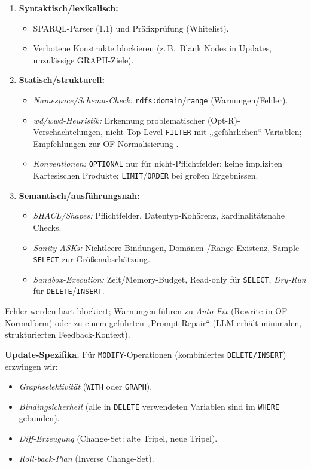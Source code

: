 \begin{enumerate}
  \item \textbf{Syntaktisch/lexikalisch:}
  \begin{itemize}
    \item SPARQL-Parser (1.1) und Präfixprüfung (Whitelist).
    \item Verbotene Konstrukte blockieren (z.\,B.\ Blank Nodes in Updates, unzulässige GRAPH-Ziele).
  \end{itemize}
  \item \textbf{Statisch/strukturell:}
  \begin{itemize}
    \item \emph{Namespace/Schema-Check:} \texttt{rdfs:domain}/\texttt{range} (Warnungen/Fehler).
    \item \emph{wd/wwd-Heuristik:} Erkennung problematischer (Opt-R)-Verschachtelungen, nicht-Top-Level \texttt{FILTER} mit „gefährlichen“ Variablen; Empfehlungen zur OF-Normalisierung \cite{kaminski2016beyond}.
    \item \emph{Konventionen:} \texttt{OPTIONAL} nur für nicht-Pflichtfelder; keine impliziten Kartesischen Produkte; \texttt{LIMIT}/\texttt{ORDER} bei großen Ergebnissen.
  \end{itemize}
  \item \textbf{Semantisch/ausführungsnah:}
  \begin{itemize}
    \item \emph{SHACL/Shapes:} Pflichtfelder, Datentyp-Kohärenz, kardinalitätsnahe Checks.
    \item \emph{Sanity-ASKs:} Nichtleere Bindungen, Domänen-/Range-Existenz, Sample-\texttt{SELECT} zur Größenabschätzung.
    \item \emph{Sandbox-Execution:} Zeit/Memory-Budget, Read-only für \texttt{SELECT}, \emph{Dry-Run} für \texttt{DELETE}/\texttt{INSERT}.
  \end{itemize}
\end{enumerate}

Fehler werden hart blockiert; Warnungen führen zu \emph{Auto-Fix} (Rewrite in OF-Normalform) oder zu einem geführten „Prompt-Repair“ (LLM erhält minimalen, strukturierten Feedback-Kontext).

\vspace{0.5em}
\noindent\textbf{Update-Spezifika.} Für \texttt{MODIFY}-Operationen (kombiniertes \texttt{DELETE/INSERT}) erzwingen wir:
\begin{itemize}
  \item \emph{Graphselektivität} (\texttt{WITH} oder \texttt{GRAPH}).
  \item \emph{Bindingsicherheit} (alle in \texttt{DELETE} verwendeten Variablen sind im \texttt{WHERE} gebunden).
  \item \emph{Diff-Erzeugung} (Change-Set: alte Tripel, neue Tripel).
  \item \emph{Roll-back-Plan} (Inverse Change-Set).
\end{itemize}


